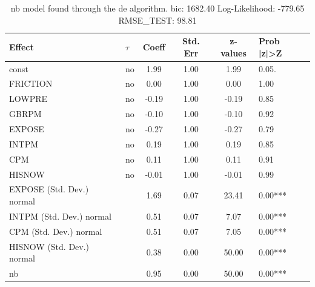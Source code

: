 \begin{table}
	\caption{nb model found through the de algorithm. bic: 1682.40 Log-Likelihood: -779.65 RMSE_TEST: 98.81}
	\begin{center}
		\begin{tabular}{|l|l|c|c|c|l|}
			\hline
			Effect & $\tau$ & Coeff & Std. Err & z-values & Prob |z|>Z \\
			\hline
			const & no & 1.99 & 1.00 & 1.99 & 0.05. \\
			\hline
			FRICTION & no & 0.00 & 1.00 & 0.00 & 1.00 \\
			\hline
			LOWPRE & no & -0.19 & 1.00 & -0.19 & 0.85 \\
			\hline
			GBRPM & no & -0.10 & 1.00 & -0.10 & 0.92 \\
			\hline
			EXPOSE & no & -0.27 & 1.00 & -0.27 & 0.79 \\
			\hline
			INTPM & no & 0.19 & 1.00 & 0.19 & 0.85 \\
			\hline
			CPM & no & 0.11 & 1.00 & 0.11 & 0.91 \\
			\hline
			HISNOW & no & -0.01 & 1.00 & -0.01 & 0.99 \\
			\hline
			EXPOSE (Std. Dev.) normal &  & 1.69 & 0.07 & 23.41 & 0.00*** \\
			\hline
			INTPM (Std. Dev.) normal &  & 0.51 & 0.07 & 7.07 & 0.00*** \\
			\hline
			CPM (Std. Dev.) normal &  & 0.51 & 0.07 & 7.05 & 0.00*** \\
			\hline
			HISNOW (Std. Dev.) normal &  & 0.38 & 0.00 & 50.00 & 0.00*** \\
			\hline
			nb &  & 0.95 & 0.00 & 50.00 & 0.00*** \\
			\hline
		\end{tabular}
	\end{center}
\end{table}